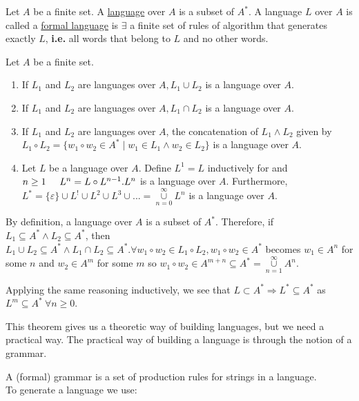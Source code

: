 \documentclass[10pt]{article}
\begin{document}
\begin{description}
		\item[qed]
		\item[Definition:] Let $A$ be a finite set. A \underline{language} over $A$ is a subset of $A^*$. A language $L$ over $A$ is called a \underline{formal language} is $\exists$ a finite set of rules of algorithm that generates exactly $L$, \textbf{i.e.} all words that belong to $L$ and no other words.
		\item[Theorem:] Let $A$ be a finite set.
		\begin{enumerate}
			\item If $L_1$ and $L_2$ are languages over $A, L_1 \cup L_2$ is a language over $A$.
			\item If $L_1$ and $L_2$ are languages over $A, L_1 \cap L_2$ is a language over $A$.
			\item If $L_1$ and $L_2$ are languages over $A$, the concatenation of $L_1 \land L_2$ given by $L_1 \circ L_2 = \{w_1 \circ w_2 \in A^* \mid w_1 \in L_1 \land w_2 \in L_2\}$ is a language over $A$.
			\item Let $L$ be a language over $A$. Define $L^1=L$ inductively for and $n\geq 1 \hspace{5mm} L^n = L \circ L^{n-1}. L^n$ is a language over $A$. Furthermore, $L^* = \{\varepsilon\} \cup L^! \cup L^2 \cup L^3 \cup ... = \underset{n=0}{\overset{\infty}{\cup}} L^n$ is a language over $A$.
		\end{enumerate}
		\item[Proof:] By definition, a language over $A$ is a subset of $A^*$. Therefore, if $L_1 \subseteq A^* \land L_2 \subseteq A^*$, then $L_1 \cup L_2 \subseteq A^* \land L_1 \cap L_2 \subseteq A^*. \forall w_1 \circ w_2 \in L_1 \circ L_2, w_1 \circ w_2 \in A^*$ becomes $w_1 \in A^n$ for some $n$ and $w_2 \in A^m$ for some $m$ so $w_1 \circ w_2 \in A^{m+n} \subseteq A^* = \underset{n=1}{\overset{\infty}{\cup}} A^n$.
		\item Applying the same reasoning inductively, we see that $L \subset A^* \Rightarrow L^* \subseteq A^*$ as $L^m \subseteq A^* \: \forall n \geq 0$.
		\item[qed]
		\item[Remark:] This theorem gives us a theoretic way of building languages, but we need a practical way. The practical way of building a language is through the notion of a grammar.
		\item[Definition:] A (formal) grammar is a set of production rules for strings in a language. \\
		To generate a language we use:

\end{description}
\end{document}
